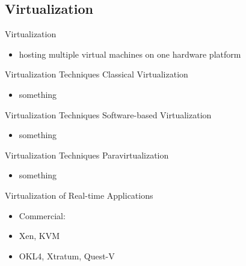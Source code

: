 \documentclass[10pt,hyperref={hyperfootnotes=false}, xcolor={usenames, dvipsnames}]{beamer}
\begin{document}
\subsection{Virtualization}
\begin{frame}{Virtualization}
  \begin{itemize}
  \item {hosting multiple virtual machines on one hardware platform}
  \end{itemize}
  	\begingroup
	
	\endgroup
\end{frame}
\begin{frame}{Virtualization Techniques} {Classical Virtualization}
  \begin{itemize}
  \item {something}
  \end{itemize}
  	\begingroup
	
	\endgroup
\end{frame}
\begin{frame}{Virtualization Techniques} {Software-based Virtualization}
  \begin{itemize}
  \item {something}
  \end{itemize}
  	\begingroup
	
	\endgroup
\end{frame}
\begin{frame}{Virtualization Techniques} {Paravirtualization}
  \begin{itemize}
  \item {something}
  \end{itemize}
  	\begingroup
	
	\endgroup
\end{frame}

\begin{frame}{Virtualization of Real-time Applications}
  \begin{itemize}
  \item {Commercial:}
  \item {Xen, KVM}
  \item {OKL4, Xtratum, Quest-V}
  \end{itemize}
\end{frame}
\end{document}
